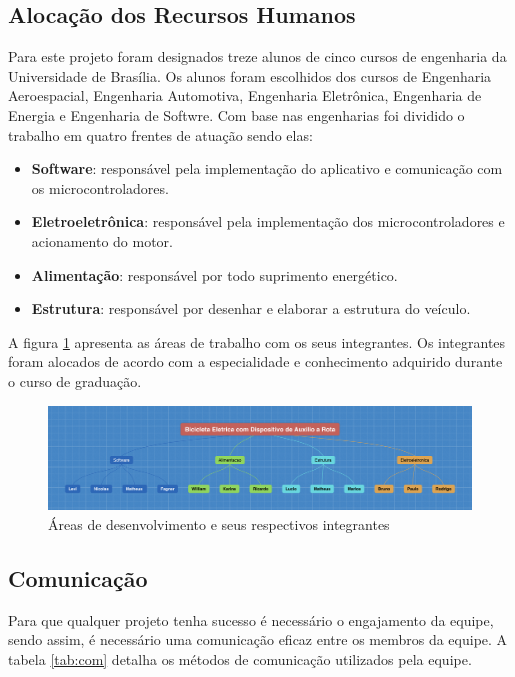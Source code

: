     \subsection{Alocação dos Recursos Humanos}
	Para este projeto foram designados treze alunos de cinco cursos de engenharia da Universidade de Brasília. Os alunos foram escolhidos dos cursos de Engenharia Aeroespacial, Engenharia Automotiva, Engenharia Eletrônica, Engenharia de Energia e Engenharia de Softwre. Com base nas engenharias foi dividido o trabalho em quatro frentes de atuação sendo elas:
	\begin{itemize}
		\item \textbf{Software}: responsável pela implementação do aplicativo e comunicação com os microcontroladores.
		\item \textbf{Eletroeletrônica}: responsável pela implementação dos microcontroladores e acionamento do motor.
		\item \textbf{Alimentação}: responsável por todo suprimento energético.
		\item \textbf{Estrutura}: responsável por desenhar e elaborar a estrutura do veículo.
	\end{itemize}
	
	A figura \ref{img:projeto} apresenta as áreas de trabalho com os seus integrantes. Os integrantes foram alocados de acordo com a especialidade e conhecimento adquirido durante o curso de graduação.
	
	\graphicspath{{figuras/}}
	\begin{figure}[h!]
	\centering
	\includegraphics[scale=0.20]{project.png}
	\caption{Áreas de desenvolvimento e seus respectivos integrantes}
	\label{img:projeto}
	\end{figure}


    \subsection{Comunicação}

      Para que qualquer projeto tenha sucesso é necessário o engajamento da equipe, sendo assim, é necessário uma comunicação eficaz entre os membros da equipe. A tabela \ref{tab:com} detalha os métodos de comunicação utilizados pela equipe.
      
